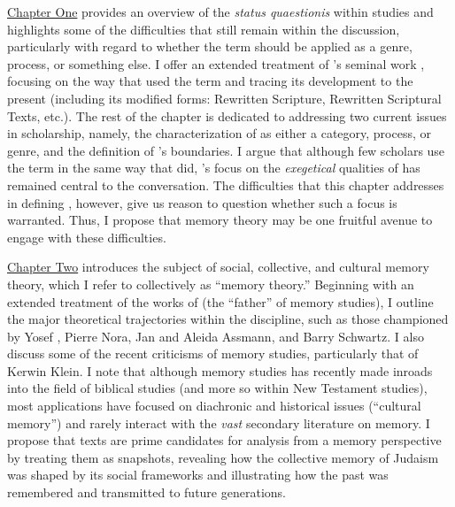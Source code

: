 \hyperref[chap:rwb]{Chapter One} provides an overview of the \emph{status quaestionis} within \rwb studies and highlights some of the difficulties that still remain within the discussion, particularly with regard to whether the term should be applied as a genre, process, or something else. I offer an extended treatment of \vermes's seminal work , focusing on the way that \vermes used the term and tracing its development to the present (including its modified forms: Rewritten Scripture, Rewritten Scriptural Texts, etc.). The rest of the chapter is dedicated to addressing two current issues in \rwb scholarship, namely, the characterization of \rwb as either a category, process, or genre, and the definition of \rwb's boundaries. I argue that although few scholars use the term \rwb in the same way that \vermes did, \vermes's focus on the \emph{exegetical} qualities of \rwb has remained central to the conversation. The difficulties that this chapter addresses in defining \rwb, however, give us reason to question whether such a focus is warranted. Thus, I propose that memory theory may be one fruitful avenue to engage with these difficulties.

\hyperref[chap:memory]{Chapter Two} introduces the subject of social, collective, and cultural memory theory, which I refer to collectively as ``memory theory.'' Beginning with an extended treatment of the works of \Halbwachs (the ``father'' of memory studies), I outline the major theoretical trajectories within the discipline, such as those championed by Yosef \yerushalmi, Pierre Nora, Jan and Aleida Assmann, and Barry Schwartz. I also discuss some of the recent criticisms of memory studies, particularly that of Kerwin Klein. I note that although memory studies has recently made inroads into the field of biblical studies (and more so within New Testament studies), most applications have focused on diachronic and historical issues (``cultural memory'') and rarely interact with the \emph{vast} secondary literature on memory. I propose that \rwb texts are prime candidates for analysis from a memory perspective by treating them as snapshots, revealing how the collective memory of \secondtemple Judaism was shaped by its social frameworks and illustrating how the past was remembered and transmitted to future generations.

